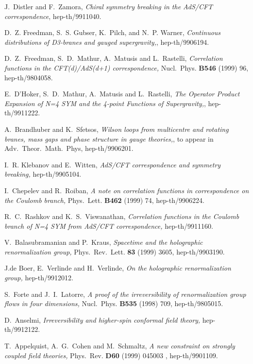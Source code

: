 \documentclass[a4paper,12pt]{article}
\begin{document}
\begin{thebibliography}{99}
 J.~Distler and F.~Zamora, {\em Chiral symmetry breaking in
the AdS/CFT correspondence}, hep-th/9911040.



 D.~Z. Freedman, S.~S. Gubser, K.~Pilch, and
N.~P. Warner, {\em Continuous distributions of D3-branes and gauged
supergravity,}, hep-th/9906194.



 D.~Z.~Freedman, S.~D.~Mathur, A.~Matusis and
L.~Rastelli, {\em Correlation functions in the CFT(d)/AdS(d+1)
correspondence,} Nucl.~Phys. {\bf B546} (1999) 96, hep-th/9804058.

 E.~D'Hoker, S.~D.~Mathur, A.~Matusis and L.~Rastelli,
{\em The Operator Product Expansion of N=4 SYM and the 4-point
Functions of Supergravity,}, hep-th/9911222.

 A.~Brandhuber and K.~Sfetsos, {\em Wilson loops from
multicentre and rotating branes, mass gaps and phase structure in
gauge theories,}, to appear in Adv.~Theor.~Math.~Phys,
hep-th/9906201.
 

 I.~R. Klebanov and E.~Witten, {\em AdS/CFT
correspondence and symmetry breaking,} hep-th/9905104.

 I.~Chepelev and R.~Roiban, {\em A note on correlation
functions in \coordHE{} correspondence on the Coulomb branch,}
Phys.~Lett. {\bf B462} (1999) 74, hep-th/9906224.


 R.~C.~Rashkov and K.~S.~Viswanathan, {\em Correlation
functions in the Coulomb branch of N=4 SYM from AdS/CFT
correspondence,} hep-th/9911160.




 V.~Balasubramanian and P.~Kraus, {\em Spacetime and the
holographic renormalization group,} Phys.~Rev.~Lett. {\bf 83} (1999)
3605, hep-th/9903190.

J.de Boer, E.~Verlinde and H.~Verlinde, {\em On the holographic renormalization group,} hep-th/9912012.

 S.~Forte and J.~I.~Latorre, {\em A proof of the
irreversibility of renormalization group flows in four dimensions,}
Nucl.~Phys. {\bf B535} (1998) 709, hep-th/9805015.

 D.~Anselmi, {\em Irreversibility and higher-spin
conformal field theory,} hep-th/9912122.

 T.~Appelquist, A.~G.~Cohen and M.~Schmaltz, {\em A new
constraint on strongly coupled field theories,} Phys.~Rev. {\bf D60}
(1999) 045003 , hep-th/9901109.



\end{thebibliography}
\end{document}
